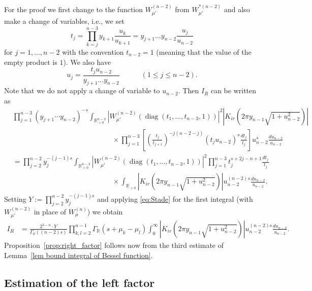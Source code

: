 \documentclass[11pt, oneside]{amsart}
\theoremstyle{plain}
\theoremstyle{remark}
\newcommand{\R}{\mathbb{R}}
\newcommand{\abs}[1]{\left|#1\right|}
\DeclareMathOperator{\diag}{diag}
\begin{document}
For the proof we first change to the function
$W_{\mu'}^{(n-2)}$ from $W^{*(n-2)}_{\mu'}$ and also make a change of variables, i.e., we set 
\[
t_j=\prod_{k=j}^{n-3}y_{k+1}\frac{u_k}{u_{k+1}}=y_{j+1}\dots y_{n-2}\frac{u_j}{u_{n-2}}
\]
for $j=1,\dots,n-2$ with the convention $t_{n-2}=1$ (meaning that the value of the
empty product is $1$).
We also have
\[
u_j=\frac{t_ju_{n-2}}{y_{j+1}\dots y_{n-2}}\quad \quad \quad (1\leq j\leq n-2).
\]
Note that we do not apply a change of variable to $u_{n-2}$. Then $I_R$ can be written as
\begin{align*}
&\prod_{j=1}^{n-3}(y_{j+1}\cdots y_{n-2})^{-s}\int_{\R_{>0}^{n-2}}\abs{W_{\mu'}^{(n-2)}\left(\diag(t_1,\dots,t_{n-3},1)\right)}^2\abs{K_{ir}\left(2\pi y_{n-1}\sqrt{1+u_{n-2}^2}\right)}\\
	&\qquad\qquad\qquad\qquad\quad\quad\qquad\qquad\times\prod_{j=1}^{n-3}
        \left[
            \left(\frac{t_j}{t_{j+1}}\right)^{-j(n-2-j)}
            (t_ju_{n-2})^{s}\frac{dt_j}{t_j}
        \right]
    u_{n-2}^{s}\frac{du_{n-2}}{u_{n-2}}\\
	&=\prod_{j=2}^{n-2}y_j^{-(j-1)s}\int_{\R_{>0}^{n-3}}
    \abs{W_{\mu'}^{(n-2)}\left(\diag(t_1,\dots,t_{n-3},1)\right)}^2
    \prod_{j=1}^{n-3}t_j^{s+2j-n+1}\frac{dt_j}{t_j}\\
	&\qquad\qquad\qquad\qquad\quad\qquad\qquad\quad\times\int_{\R_{>0}}\abs{K_{ir}\left(2\pi y_{n-1}\sqrt{1+u_{n-2}^2}\right)}u_{n-2}^{(n-2)s}\frac{du_{n-2}}{u_{n-2}}.
\end{align*}
Setting $Y:=\prod_{j=2}^{n-2}y_j^{-(j-1)s}$ and applying  \eqref{eq:Stade} 
for the first integral (with $W_{\mu'}^{(n-2)}$ 
in place of $W_\mu^{(n)}$)
we obtain
\begin{align*}
I_R&=\frac{2^{3-n}\cdot Y}{\Gamma_\R((n-2)s)}\prod_{k,l=2}^{n-1}\Gamma_\R(s+\mu_k-\mu_l)\int_{0}^\infty\abs{K_{ir}\left(2\pi y_{n-1}\sqrt{1+u_{n-2}^2}\right)}u_{n-2}^{(n-2)s}\frac{du_{n-2}}{u_{n-2}}.
\end{align*}
Proposition~\ref{prop:right_factor} follows now from the third estimate
of Lemma~\ref{lem bound integral of Bessel function}.

\subsection{Estimation of the left factor}
\end{document}
